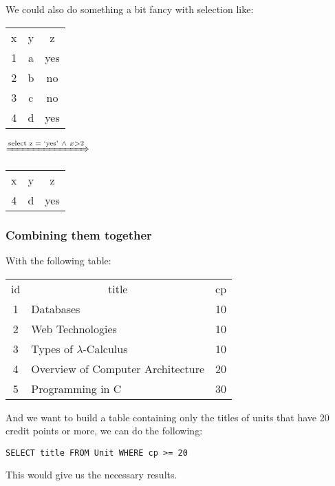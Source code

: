 \documentclass[11pt,a4paper,titlepage,dvipsnames,cmyk]{scrartcl}
\begin{document}
We could also do something a bit fancy with selection like:

\begin{center}
    \begin{tabular}{c|c|c}
        x & y & z \\
        \hhline{=|=|=}
        1 & a & yes \\
        2 & b & no \\
        3 & c & no \\
        4 & d & yes
    \end{tabular}
    \quad \quad $\xRightarrow{\text{select z = `yes'} \ \wedge \ x>2}$
    \quad \quad
    \begin{tabular}{c|c|c}
        x & y & z \\ \hhline{=|=|=}
        4 & d & yes
    \end{tabular}
\end{center}

\subsubsection{Combining them together}%
\label{ssub:combining}
With the following table:

\begin{center}
    \begin{tabular}{c|l|c}
        id & \multicolumn{1}{|c|}{title} & cp \\ \hhline{=|=|=}
        1 & Databases & 10 \\
        2 & Web Technologies & 10 \\
        3 & Types of $\lambda$-Calculus & 10 \\
        4 & Overview of Computer Architecture & 20 \\
        5 & Programming in C & 30 \\
    \end{tabular}
\end{center}

And we want to build a table containing only the titles of units that have
20 credit points or more, we can do the following:

\begin{lstlisting}[style=B]
SELECT title FROM Unit WHERE cp >= 20
\end{lstlisting}

This would give us the necessary results.
\end{document}
